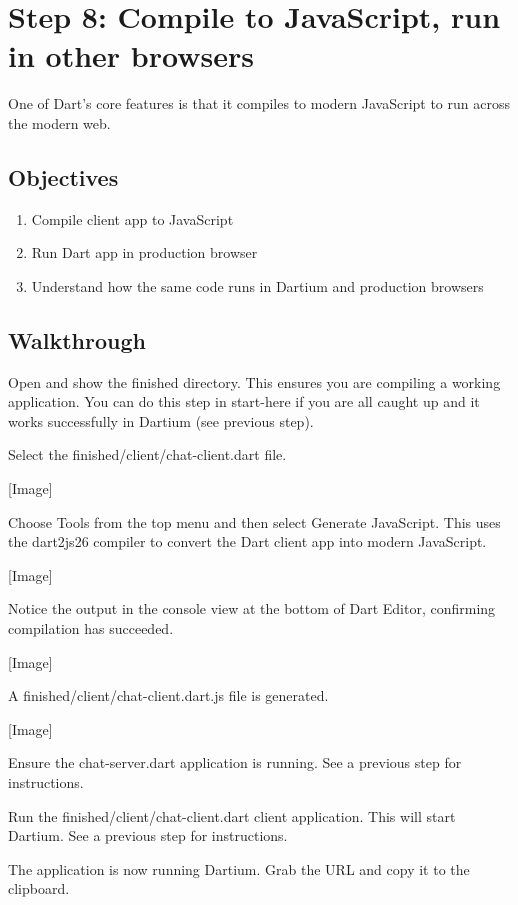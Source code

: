 \section{Step 8: Compile to JavaScript, run in other browsers}

One of Dart’s core features is that it compiles to modern JavaScript to run across the modern web.

\subsection{Objectives}

\begin{enumerate}
\item Compile client app to JavaScript
\item Run Dart app in production browser
\item Understand how the same code runs in Dartium and production browsers
\end{enumerate}

\subsection{Walkthrough}

Open and show the finished directory. This ensures you are compiling a working application. You can do this step in start-here if you are all caught up and it works successfully in Dartium (see previous step).

Select the finished/client/chat-client.dart file.

[Image]

Choose Tools from the top menu and then select Generate JavaScript. This uses the dart2js26 compiler to convert the Dart client app into modern JavaScript.

[Image]

Notice the output in the console view at the bottom of Dart Editor, confirming compilation has succeeded.

[Image]

A finished/client/chat-client.dart.js file is generated.

[Image]

Ensure the chat-server.dart application is running. See a previous step for instructions.

Run the finished/client/chat-client.dart client application. This will start Dartium. See a previous step for instructions.

The application is now running Dartium. Grab the URL and copy it to the clipboard.

